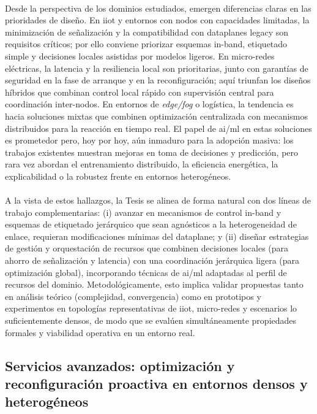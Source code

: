 \\
Desde la perspectiva de los dominios estudiados, emergen diferencias claras en las prioridades de diseño. En \gls{iiot} y entornos con nodos con capacidades limitadas, la minimización de señalización y la compatibilidad con dataplanes legacy son requisitos críticos; por ello conviene priorizar esquemas in-band, etiquetado simple y decisiones locales asistidas por modelos ligeros. En micro-redes eléctricas, la latencia y la resiliencia local son prioritarias, junto con garantías de seguridad en la fase de arranque y en la reconfiguración; aquí triunfan los diseños híbridos que combinan control local rápido con supervisión central para coordinación inter-nodos. En entornos de \textit{edge/fog} o logística, la tendencia es hacia soluciones mixtas que combinen optimización centralizada con mecanismos distribuidos para la reacción en tiempo real. El papel de \gls{ai}/\gls{ml} en estas soluciones es prometedor pero, hoy por hoy, aún inmaduro para la adopción masiva: los trabajos existentes muestran mejoras en toma de decisiones y predicción, pero rara vez abordan el entrenamiento distribuido, la eficiencia energética, la explicabilidad o la robustez frente en entornos heterogéneos.\\
\\
A la vista de estos hallazgos, la Tesis se alinea de forma natural con dos líneas de trabajo complementarias: (i) avanzar en mecanismos de control in-band y esquemas de etiquetado jerárquico que sean agnósticos a la heterogeneidad de enlace, requieran modificaciones mínimas del dataplane; y (ii) diseñar estrategias de gestión y orquestación de recursos que combinen decisiones locales (para ahorro de señalización y latencia) con una coordinación jerárquica ligera (para optimización global), incorporando técnicas de \gls{ai}/\gls{ml} adaptadas al perfil de recursos del dominio. Metodológicamente, esto implica validar propuestas tanto en análisis teórico (complejidad, convergencia) como en prototipos y experimentos en topologías representativas de \gls{iiot}, micro-redes y escenarios lo suficientemente densos, de modo que se evalúen simultáneamente propiedades formales y viabilidad operativa en un entorno real.




\subsection{Servicios avanzados: optimización y reconfiguración proactiva en entornos densos y heterogéneos}

